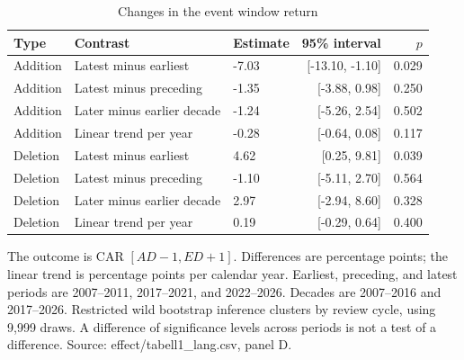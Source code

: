 \begin{table}[!htbp]
\centering
\caption{Changes in the event window return}\label{tab:contrasts}
\small
\setlength{\tabcolsep}{5pt}
\begin{tabular}{lllrr}
\toprule
Type & Contrast & Estimate & 95\% interval & $p$ \\
\midrule
Addition & Latest minus earliest & -7.03 & [-13.10, -1.10] & 0.029 \\
Addition & Latest minus preceding & -1.35 & [-3.88, 0.98] & 0.250 \\
Addition & Later minus earlier decade & -1.24 & [-5.26, 2.54] & 0.502 \\
Addition & Linear trend per year & -0.28 & [-0.64, 0.08] & 0.117 \\
Deletion & Latest minus earliest & 4.62 & [0.25, 9.81] & 0.039 \\
Deletion & Latest minus preceding & -1.10 & [-5.11, 2.70] & 0.564 \\
Deletion & Later minus earlier decade & 2.97 & [-2.94, 8.60] & 0.328 \\
Deletion & Linear trend per year & 0.19 & [-0.29, 0.64] & 0.400 \\
\bottomrule
\end{tabular}
\begin{minipage}{\linewidth}\footnotesize\vspace{5pt}
The outcome is CAR $[AD-1,ED+1]$. Differences are percentage points; the linear trend is percentage points per calendar year. Earliest, preceding, and latest periods are 2007--2011, 2017--2021, and 2022--2026. Decades are 2007--2016 and 2017--2026. Restricted wild bootstrap inference clusters by review cycle, using 9,999 draws. A difference of significance levels across periods is not a test of a difference. Source: effect/tabell1\_lang.csv, panel D.
\end{minipage}
\end{table}
